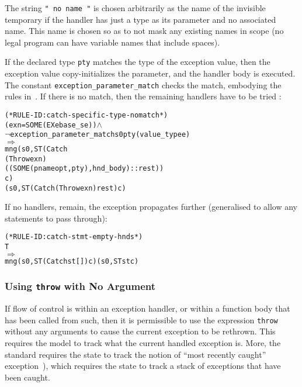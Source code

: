 \documentclass[11pt]{article}
\begin{document}
The string \texttt{" no name "} is chosen arbitrarily as the name of
the invisible temporary if the handler has just a type as its
parameter and no associated name.  This name is chosen so as to not
mask any existing names in scope (no legal \cpp{} program can have
variable names that include spaces).

If the declared type \texttt{pty} matches the type of the exception
value, then the exception value copy-initializes the parameter, and
the handler body is executed.  The constant
\texttt{exception_parameter_match} checks the match, embodying the
rules in~\cite[\S15.3, paragraph 3]{cpp-standard-iso14882}.  If there
is no match, then the remaining handlers have to be tried
:
\begin{center}
  \begin{minipage}{\textwidth}
%
\begin{alltt}
(* RULE-ID: catch-specific-type-nomatch *)
     (exn = SOME (EX e base_se)) \(\land\)
     \(\neg\)exception_parameter_match s0 pty (value_type e)
   \(\Rightarrow\)
     mng (s0, ST (Catch
                    (Throw exn)
                    ((SOME(pnameopt, pty), hnd_body) :: rest))
                 c)
         (s0, ST (Catch (Throw exn) rest) c)
\end{alltt}
  \end{minipage}
\end{center}
If no handlers, remain, the exception propagates further
 (generalised to allow any statements to
pass through):
\begin{center}
  \begin{minipage}{\textwidth}
%
\begin{alltt}
(* RULE-ID: catch-stmt-empty-hnds *)
     T
   \(\Rightarrow\)
     mng (s0, ST (Catch st []) c) (s0, ST st c)
\end{alltt}
  \end{minipage}
\end{center}

\subsubsection{Using \texttt{throw} with No Argument}
\label{sec:throw-none}

If flow of control is within an exception handler, or within a
function body that has been called from such, then it is permissible
to use the expression \texttt{throw} without any arguments to cause
the current exception to be rethrown.  This requires the model to
track what the current handled exception is.  More, the standard
requires the state to track the notion of ``most recently caught''
exception~\cite[\S15.1, paragraph 7]{cpp-standard-iso14882}), which
requires the state to track a stack of exceptions that have been
caught.
\end{document}
